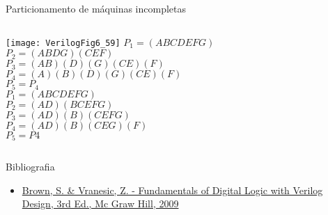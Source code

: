\begin{frame}{Particionamento de máquinas incompletas} \centering
    \begin{columns}
            \vspace{2cm}
            \texttt{[image: VerilogFig6\_59]} 
            \footnotesize
            $P_1 = (ABCDEFG)$ \\
            $P_2 = (ABDG)(CEF)$ \\
            $P_3 = (AB)(D)(G)(CE)(F)$ \\
            $P_4 = (A)(B)(D)(G)(CE)(F)$ \\
            $P_5 = P_4$ \\
            \pause
            \vspace{1cm}
            $P_1 = (ABCDEFG)$ \\
            $P_2 = (AD)(BCEFG)$ \\
            $P_3 = (AD)(B)(CEFG) $ \\
            $P_4 = (AD)(B)(CEG)(F) $ \\
            $P_5 = P4$ \\
    \end{columns}
\end{frame}

\begin{frame}{Bibliografia} 
	\begin{itemize}
		\item \href{https://www.google.com.br/search?q=filetype\%3Apdf+Fundamentals+of+Digital+Logic+with+Verilog+Design+&oq=filetype\%3Apdf}{Brown, S. \& Vranesic, Z. - Fundamentals of Digital Logic with Verilog Design, 3rd Ed., Mc Graw Hill, 2009}
	\end{itemize}
\end{frame}

\begin{frame}
	\titlepage
\end{frame} 







